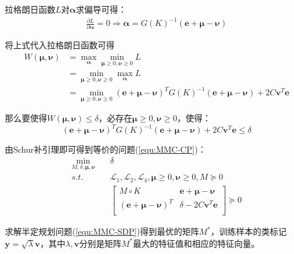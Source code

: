 拉格朗日函数$L$对$\mathbf{\alpha}$求偏导可得：
\begin{equation}
\begin{split}
\frac{\partial L}{\partial\mathbf{\alpha}}=0 \Longrightarrow \mathbf{\alpha} = G(K)^{-1}(\mathbf{e} + \mathbf{\mu} - \mathbf{\nu}) 
\end{split}
\end{equation}

将上式代入拉格朗日函数可得
\begin{equation}
\begin{split}
W(\mathbf{\mu},\mathbf{\nu}) & = \max_{\mathbf{\alpha}}\min_{\mathbf{\mu}\ge 0,\mathbf{\nu}\ge 0}L \\
& = \min_{\mathbf{\mu}\ge 0,\mathbf{\nu}\ge 0}\max_{\mathbf{\alpha}} L \\
& = \min_{\mathbf{\mu}\ge 0,\mathbf{\nu}\ge 0}(\mathbf{e}+\mathbf{\mu}-\mathbf{\nu})^TG(K)^{-1}(\mathbf{e}+\mathbf{\mu}-\mathbf{\nu}) + 2C\mathbf{v}^T\mathbf{e}
\end{split}
\end{equation}

那么要使得$W(\mathbf{\mu},\mathbf{\nu}) \le \delta$，必存在$\mathbf{\mu}\ge 0,\mathbf{\nu}\ge 0$，使得：
$$(\mathbf{e}+\mathbf{\mu}-\mathbf{\nu})^TG(K)^{-1}(\mathbf{e}+\mathbf{\mu}-\mathbf{\nu}) + 2C\mathbf{v}^T\mathbf{e} \le \delta$$

由Schur补引理即可得到等价的问题(\ref{equ:MMC-CP})：
\begin{equation}
\begin{split}
\min_{M,\delta,\mathbf{\mu},\mathbf{\nu}} \quad & \delta \\
s.t. \quad & \mathcal{L}_1,\mathcal{L}_2,\mathcal{L}_4,\mathbf{\mu} \ge 0,\mathbf{\nu} \ge 0, M \succeq 0 \\
&    \left[\begin{matrix}
      M \circ K & \mathbf{e} + \mathbf{\mu} - \mathbf{\nu} \\
      (\mathbf{e} + \mathbf{\mu} - \mathbf{\nu})^T & \delta - 2C\mathbf{v}^T\mathbf{e} \\
   \end{matrix}\right] \succeq 0
   \label{equ:MMC-SDP}
\end{split}
\end{equation}

求解半定规划问题(\ref{equ:MMC-SDP})得到最优的矩阵$M^*$，训练样本的类标记$\mathbf{y}=\sqrt{\mathit{\lambda}}\mathbf{v}$，其中$\mathit{\lambda},\mathbf{v}$分别是矩阵$M^*$最大的特征值和相应的特征向量。

